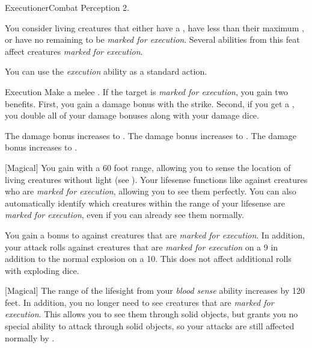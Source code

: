     \begin{feat}{Executioner}{Combat}
        \featpres Perception 2.

         You consider living creatures that either have a , have less than their maximum , or have no remaining  to be \textit{marked for execution}.
        Several abilities from this feat affect creatures \textit{marked for execution}.

         You can use the \textit{execution} ability as a standard action.
        \begin{activeability}{Execution}
            \rankline
            Make a melee .
            If the target is \textit{marked for execution}, you gain two benefits.
            First, you gain a  damage bonus with the strike.
            Second, if you get a , you double all of your damage bonuses along with your damage dice.

            \rankline
             The damage bonus increases to .
             The damage bonus increases to .
             The damage bonus increases to .
        \end{activeability}

        [Magical] You gain  with a 60 foot range, allowing you to sense the location of living creatures without light (see ).
        Your lifesense functions like  against creatures who are \textit{marked for execution}, allowing you to see them perfectly.
        You can also automatically identify which creatures within the range of your lifesense are \textit{marked for execution}, even if you can already see them normally.

         You gain a  bonus to  against creatures that are \textit{marked for execution}.
        In addition, your attack rolls against creatures that are \textit{marked for execution}  on a 9 in addition to the normal explosion on a 10.
        This does not affect additional rolls with exploding dice.

        [Magical] The range of the lifesight from your \textit{blood sense} ability increases by 120 feet.
        In addition, you no longer need  to see creatures that are \textit{marked for execution}.
        This allows you to see them through solid objects, but grants you no special ability to attack through solid objects, so your attacks are still affected normally by .


\end{feat}
